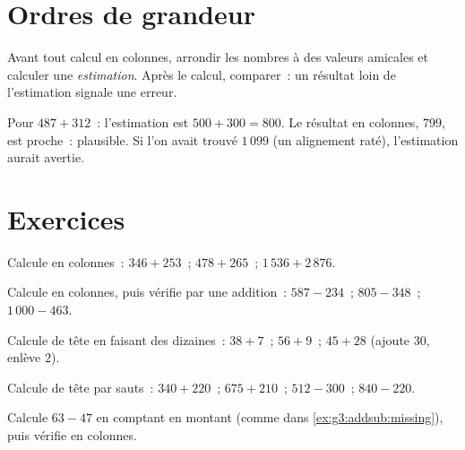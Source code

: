 \section{Ordres de grandeur}

\begin{method}\label{met:g3:addsub:estimate}
Avant tout calcul en colonnes, arrondir les nombres à des valeurs
amicales et calculer une \emph{estimation}. Après le calcul,
comparer~: un résultat loin de l'estimation signale une erreur.
\end{method}

\begin{example}
Pour $487 + 312$~: l'estimation est $500 + 300 = 800$. Le résultat
en colonnes, $799$, est proche~: plausible. Si l'on avait trouvé
$1\,099$ (un alignement raté), l'estimation aurait avertie.
\end{example}

\section{Exercices}

\begin{exercise}[$\star$]\label{exo:g3:addsub:1}
Calcule en colonnes~: $346 + 253$~; \quad $478 + 265$~; \quad
$1\,536 + 2\,876$.
\end{exercise}

\begin{exercise}[$\star$]\label{exo:g3:addsub:2}
Calcule en colonnes, puis vérifie par une addition~:
$587 - 234$~; \quad $805 - 348$~; \quad $1\,000 - 463$.
\end{exercise}

\begin{exercise}[$\star$]\label{exo:g3:addsub:3}
Calcule de tête en faisant des dizaines~: $38 + 7$~; \quad
$56 + 9$~; \quad $45 + 28$ (ajoute $30$, enlève $2$).
\end{exercise}

\begin{exercise}[$\star$]\label{exo:g3:addsub:4}
Calcule de tête par sauts~: $340 + 220$~; \quad $675 + 210$~; \quad
$512 - 300$~; \quad $840 - 220$.
\end{exercise}

\begin{exercise}[$\star$]\label{exo:g3:addsub:5}
Calcule $63 - 47$ en comptant en montant (comme dans
\cref{ex:g3:addsub:missing}), puis vérifie en colonnes.
\end{exercise}

